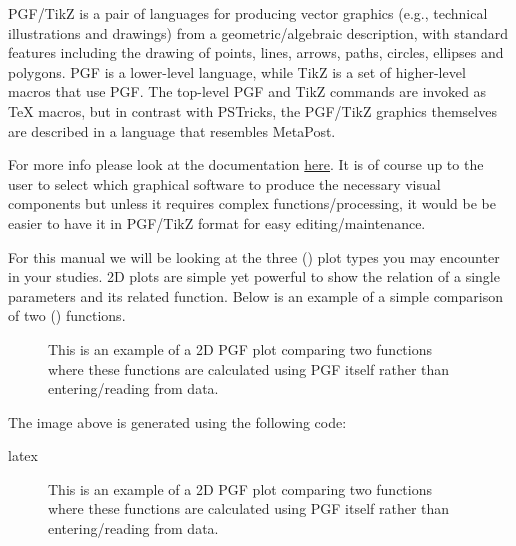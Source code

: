 \documentclass[minted, draw]{../tex/hebdomon}
\begin{document}
\begin{excerpt}
	PGF/TikZ is a pair of languages for producing vector graphics
	(e.g., technical illustrations and drawings) from a geometric/algebraic description, with
	standard features including the drawing of points, lines, arrows, paths, circles,
	ellipses and polygons. PGF is a lower-level language, while TikZ is a set of higher-level
	macros that use PGF. The top-level PGF and TikZ commands are invoked as TeX macros,
	but in contrast with PSTricks, the PGF/TikZ graphics themselves are described in a
	language that resembles MetaPost.
\end{excerpt}

For more info please look at the documentation \href{https://tikz.dev/pgfplots/}{here}.
It is of course up to the user to select which graphical software to produce the necessary
visual components but unless it requires complex functions/processing, it would be be easier
to have it in PGF/TikZ format for easy editing/maintenance.

For this manual we will be looking at the three () plot types you may
encounter in your studies.
%
%
2D plots are simple yet powerful to show the relation of a single parameters
and its related function.
Below is an example of a simple comparison of two () functions.
%
\begin{figure}[!ht]
	\centering
	\caption{This is an example of a 2D PGF plot comparing
		two functions where these functions are calculated using
		PGF itself rather than entering/reading from data.}
\end{figure}
%
The image above is generated using the following code:

\begin{code}{latex}
\begin{figure}[!ht]
  \centering
  \caption{This is an example of a 2D PGF plot comparing
  two functions where these functions are calculated using
  PGF itself rather than entering/reading from data.}
\end{figure}
\end{code}
\end{document}
